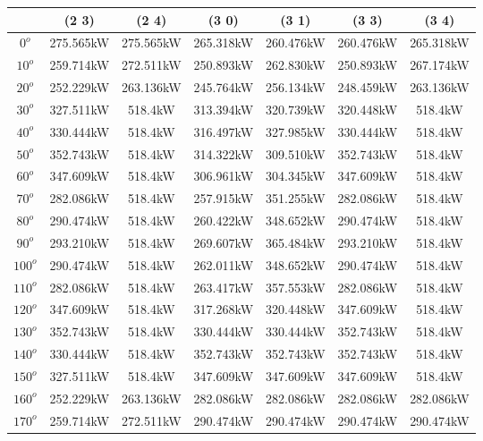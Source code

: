         \begin{table}[H]
        	\centering
        	\begin{tabular}{|c|c|c|c|c|c|c|} \hline
        			& (2 3)		& (2 4)		& (3 0)		& (3 1)		& (3 3)		& (3 4)		\\ \hline
		$0^o$	& 275.565kW	& 275.565kW	& 265.318kW	& 260.476kW	& 260.476kW	& 265.318kW	\\ \hline
		$10^o$	& 259.714kW	& 272.511kW	& 250.893kW	& 262.830kW	& 250.893kW	& 267.174kW	\\ \hline
		$20^o$	& 252.229kW	& 263.136kW	& 245.764kW	& 256.134kW	& 248.459kW	& 263.136kW	\\ \hline
		$30^o$	& 327.511kW	& 518.4kW	& 313.394kW	& 320.739kW	& 320.448kW	& 518.4kW	\\ \hline
		$40^o$	& 330.444kW	& 518.4kW	& 316.497kW	& 327.985kW	& 330.444kW	& 518.4kW	\\ \hline
		$50^o$	& 352.743kW	& 518.4kW	& 314.322kW	& 309.510kW	& 352.743kW	& 518.4kW	\\ \hline
		$60^o$	& 347.609kW	& 518.4kW	& 306.961kW	& 304.345kW	& 347.609kW	& 518.4kW	\\ \hline
		$70^o$	& 282.086kW	& 518.4kW	& 257.915kW	& 351.255kW	& 282.086kW	& 518.4kW	\\ \hline
		$80^o$	& 290.474kW	& 518.4kW	& 260.422kW	& 348.652kW	& 290.474kW	& 518.4kW	\\ \hline
		$90^o$	& 293.210kW	& 518.4kW	& 269.607kW	& 365.484kW	& 293.210kW	& 518.4kW	\\ \hline
		$100^o$	& 290.474kW	& 518.4kW	& 262.011kW	& 348.652kW	& 290.474kW	& 518.4kW	\\ \hline
		$110^o$	& 282.086kW	& 518.4kW	& 263.417kW	& 357.553kW	& 282.086kW	& 518.4kW	\\ \hline
		$120^o$	& 347.609kW	& 518.4kW	& 317.268kW	& 320.448kW	& 347.609kW	& 518.4kW	\\ \hline
		$130^o$	& 352.743kW	& 518.4kW	& 330.444kW	& 330.444kW	& 352.743kW	& 518.4kW	\\ \hline
		$140^o$	& 330.444kW	& 518.4kW	& 352.743kW	& 352.743kW	& 352.743kW	& 518.4kW	\\ \hline
		$150^o$	& 327.511kW	& 518.4kW	& 347.609kW	& 347.609kW	& 347.609kW	& 518.4kW	\\ \hline
		$160^o$	& 252.229kW	& 263.136kW	& 282.086kW	& 282.086kW	& 282.086kW	& 282.086kW	\\ \hline
		$170^o$	& 259.714kW	& 272.511kW	& 290.474kW	& 290.474kW	& 290.474kW	& 290.474kW	\\ \hline

\end{tabular}
\end{table}

